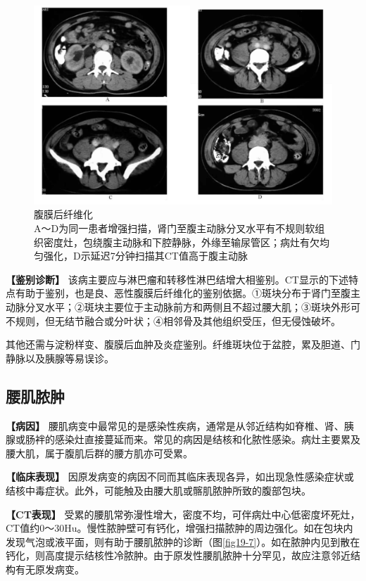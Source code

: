 \begin{figure}[!htbp]
 \centering
 \includegraphics[width=.7\textwidth,height=\textheight,keepaspectratio]{./images/Image00387.jpg}
 \captionsetup{justification=centering}
 \caption{腹膜后纤维化\\{\small A～D为同一患者增强扫描，肾门至腹主动脉分叉水平有不规则软组织密度灶，包绕腹主动脉和下腔静脉，外缘至输尿管区；病灶有欠均匀强化，D示延迟7分钟扫描其CT值高于腹主动脉}}
 \label{fig19-6}
  \end{figure} 

\textbf{【鉴别诊断】}
该病主要应与淋巴瘤和转移性淋巴结增大相鉴别。CT显示的下述特点有助于鉴别，也是良、恶性腹膜后纤维化的鉴别依据。①斑块分布于肾门至腹主动脉分叉水平；②斑块主要位于主动脉前方和两侧且不超过腰大肌；③斑块外形可不规则，但无结节融合或分叶状；④相邻骨及其他组织受压，但无侵蚀破坏。

其他还需与淀粉样变、腹膜后血肿及炎症鉴别。纤维斑块位于盆腔，累及胆道、门静脉以及胰腺等易误诊。

\subsection{腰肌脓肿}

\textbf{【病因】}
腰肌病变中最常见的是感染性疾病，通常是从邻近结构如脊椎、肾、胰腺或肠袢的感染灶直接蔓延而来。常见的病因是结核和化脓性感染。病灶主要累及腰大肌，属于腹肌后群的腰方肌亦可受累。

\textbf{【临床表现】}
因原发病变的病因不同而其临床表现各异，如出现急性感染症状或结核中毒症状。此外，可能触及由腰大肌或髂肌脓肿所致的腹部包块。

\textbf{【CT表现】}
受累的腰肌常弥漫性增大，密度不均，可伴病灶中心低密度坏死灶，CT值约0～30Hu。慢性脓肿壁可有钙化，增强扫描脓肿的周边强化。如在包块内发现气泡或液平面，则有助于腰肌脓肿的诊断（图\ref{fig19-7}）。如在脓肿内见到散在钙化，则高度提示结核性冷脓肿。由于原发性腰肌脓肿十分罕见，故应注意邻近结构有无原发病变。

